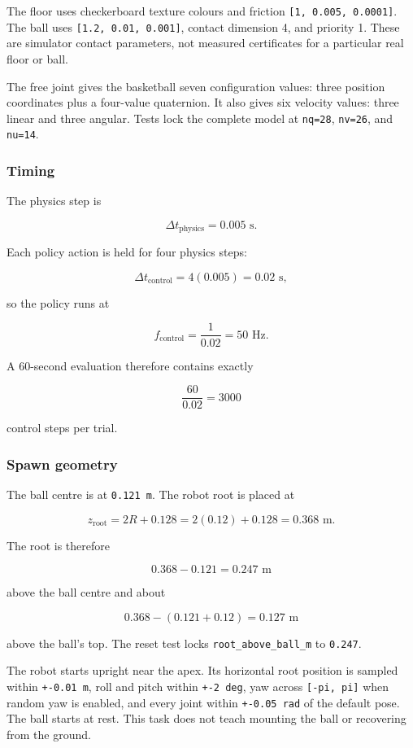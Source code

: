 \documentclass[
  american,
  11pt,
  letterpaper,
]{article}
\begin{document}
The floor uses checkerboard texture colours and friction
\texttt{{[}1,\ 0.005,\ 0.0001{]}}. The ball uses
\texttt{{[}1.2,\ 0.01,\ 0.001{]}}, contact dimension 4, and priority 1.
These are simulator contact parameters, not measured certificates for a
particular real floor or ball.

The free joint gives the basketball seven configuration values: three
position coordinates plus a four-value quaternion. It also gives six
velocity values: three linear and three angular. Tests lock the complete
model at \texttt{nq=28}, \texttt{nv=26}, and \texttt{nu=14}.

\subsubsection{Timing}\label{timing}

The physics step is

\[
\Delta t_{\text{physics}}=0.005\text{ s}.
\]

Each policy action is held for four physics steps:

\[
\Delta t_{\text{control}}
=4(0.005)
=0.02\text{ s},
\]

so the policy runs at

\[
f_{\text{control}}=\frac{1}{0.02}=50\text{ Hz}.
\]

A 60-second evaluation therefore contains exactly

\[
\frac{60}{0.02}=3000
\]

control steps per trial.

\subsubsection{Spawn geometry}\label{spawn-geometry}

The ball centre is at \texttt{0.121\ m}. The robot root is placed at

\[
z_{\text{root}}
=2R+0.128
=2(0.12)+0.128
=0.368\text{ m}.
\]

The root is therefore

\[
0.368-0.121=0.247\text{ m}
\]

above the ball centre and about

\[
0.368-(0.121+0.12)=0.127\text{ m}
\]

above the ball's top. The reset test locks
\texttt{root\_\allowbreak{}above\_\allowbreak{}ball\_\allowbreak{}m} to
\texttt{0.247}.

The robot starts upright near the apex. Its horizontal root position is
sampled within \texttt{+-0.01\ m}, roll and pitch within
\texttt{+-2\ deg}, yaw across \texttt{{[}-pi,\ pi{]}} when random yaw is
enabled, and every joint within \texttt{+-0.05\ rad} of the default
pose. The ball starts at rest. This task does not teach mounting the
ball or recovering from the ground.
\end{document}
